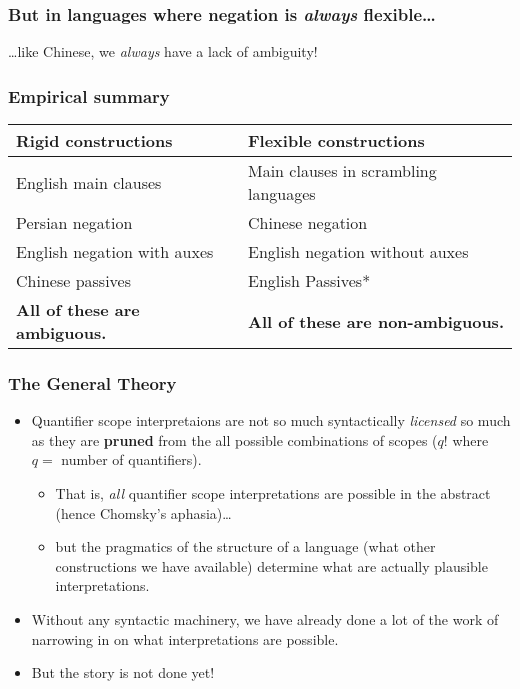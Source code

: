\documentclass{beamer}
\begin{document}
\begin{frame}
	\frametitle{But in languages where negation is \emph{always} flexible\ldots}

	{\ldots}like Chinese, we \emph{always} have a lack of ambiguity!

	\begin{exe}
	\end{exe}

\end{frame}

\begin{frame}
	\frametitle{Empirical summary}\pause
	\centering

	\begin{tabular}{l|l}
		Rigid constructions & Flexible constructions\\\hline\pause
		English main clauses&Main clauses in scrambling languages\\\pause
		Persian negation&Chinese negation\\\pause
		English negation with auxes&English negation without auxes\\\pause
		Chinese passives&English Passives*\\\pause
		\textbf{All of these are ambiguous.}&\textbf{All of these are non-ambiguous.}
	\end{tabular}
\end{frame}

\begin{frame}
	\frametitle{The General Theory}\pause

	\begin{itemize}
		\item Quantifier scope interpretaions are not so much syntactically \emph{licensed} so much as they are \textbf{pruned} from the all possible combinations of scopes ($q!$ where $q=$ number of quantifiers).\pause
			\begin{itemize}
				\item That is, \emph{all} quantifier scope interpretations are possible in the abstract (hence Chomsky's aphasia)\ldots\pause
				\item but the pragmatics of the structure of a language (what other constructions we have available) determine what are actually plausible interpretations.\pause
			\end{itemize}

		\item Without any syntactic machinery, we have already done a lot of the work of narrowing in on what interpretations are possible.\pause
		\item But the story is not done yet!
	\end{itemize}
\end{frame}
\end{document}

